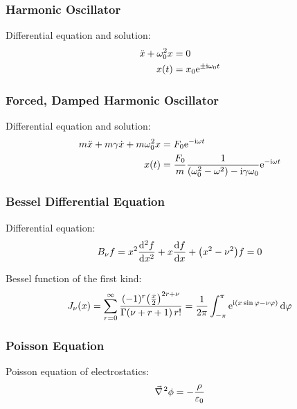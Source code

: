 		\subsubsection{Harmonic Oscillator}
			\noindent
			Differential equation and solution:
			\begin{equation}
				\begin{aligned}
					\ddot{x}+\omega_0^2 x &= 0 \\
					x(t) &= x_0 \mathrm{e}^{\pm \mathrm{i}\omega_0 t}
				\end{aligned}
			\end{equation}

		\subsubsection{Forced, Damped Harmonic Oscillator}
			\noindent
			Differential equation and solution:
			\begin{equation}
				\begin{aligned}
					m\ddot{x}+m\gamma\dot{x}+m\omega_0^2 x &= F_0 \mathrm{e}^{-\mathrm{i}\omega t} \\
					x(t) &= \frac{F_0}{m} \frac{1}{\left(\omega_0^2-\omega^2\right)-\mathrm{i} \gamma\omega_0} \mathrm{e}^{-\mathrm{i}\omega t}
				\end{aligned}
			\end{equation}

		\subsubsection{Bessel Differential Equation}
			\noindent
			Differential equation:
			\begin{equation}
				B_\nu f = x^2\dv[2]{f}{x} + x\dv{f}{x}+\qty(x^2-\nu^2)f = 0
			\end{equation}

			\noindent
			Bessel function of the first kind:
			\begin{equation}
				J_\nu(x) = \sum_{r=0}^\infty \frac{(-1)^r\qty(\frac{x}{2})^{2r+\nu}}{\Gamma(\nu+r+1)\,r!} = \frac{1}{2\pi}\int_{-\pi}^{\pi} \mathrm{e}^{\mathrm{i}(x\sin\varphi-\nu\varphi)}\dd{\varphi}
			\end{equation}

		\subsubsection{Poisson Equation}
			\noindent
			Poisson equation of electrostatics:
			\begin{equation}
				\Nabla^2\phi = -\frac{\rho}{\varepsilon_0}
			\end{equation}


